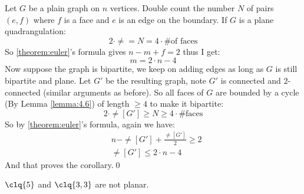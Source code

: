 \begin{prf}
    Let $G$ be a plain graph on $n$ vertices. Double count the number $N$ of pairs $(e, f)$ where $f$ is a face and $e$ is an edge on the boundary. If $G$ is a plane quadrangulation:
    \begin{equation*}
        2 \cdot \ne = N = 4 \cdot \text{\# of faces}
    \end{equation*}
    So \ref{theorem:euler}'s formula gives $n - m + f = 2$ thus I get:
    \begin{equation*}
        m = 2 \cdot n - 4
    \end{equation*}
    Now suppose the graph is bipartite, we keep on adding edges as long as $G$ is still bipartite and plane. Let $G'$ be the resulting graph, note $G'$ is connected and $2$-connected (similar arguments as before). So all faces of $G$ are bounded by a cycle (By Lemma \ref{lemma:4.6}) of length $\geq 4$ to make it bipartite:
    \begin{equation*}
        2 \cdot \ne[G'] \geq N \geq 4 \cdot \text{\# faces}
    \end{equation*}
    So by \ref{theorem:euler}'s formula, again we have:
    \begin{align*}
        &n - \ne[G'] + \frac{\ne[G']}{2} \geq 2 \\
        &\ne[G'] \leq 2 \cdot n - 4
    \end{align*}
    And that proves the corollary.\qed
\end{prf}
\begin{customcorollary}{4.11}
\label{corollary:4.11}
    $\clq{5}$ and $\clq{3, 3}$ are not planar.
\end{customcorollary}